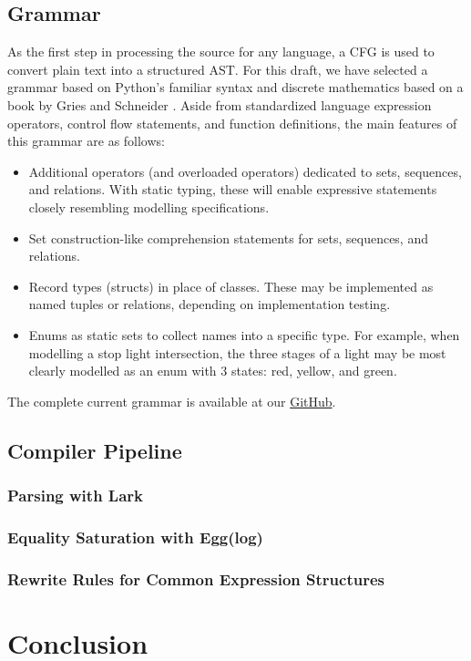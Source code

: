 \documentclass{article}
\begin{document}
\subsection{Grammar}

As the first step in processing the source for any language, a CFG is used to convert plain text into a structured AST. For this draft, we have selected a grammar based on Python's familiar syntax \cite{pythonGrammar} and discrete mathematics based on a book by Gries and Schneider \cite{griesAndSchneider}. Aside from standardized language expression operators, control flow statements, and function definitions, the main features of this grammar are as follows:
\begin{itemize}
  \item Additional operators (and overloaded operators) dedicated to sets, sequences, and relations. With static typing, these will enable expressive statements closely resembling modelling specifications.
  \item Set construction-like comprehension statements for sets, sequences, and relations.
  \item Record types (structs) in place of classes. These may be implemented as named tuples or relations, depending on implementation testing.
  \item Enums as static sets to collect names into a specific type. For example, when modelling a stop light intersection, the three stages of a light may be most clearly modelled as an enum with 3 states: red, yellow, and green.
\end{itemize}

The complete current grammar is available at our \href{https://github.com/Ant13731/compilers/blob/main/implementation/grammar.lark}{GitHub}.

\subsection{Compiler Pipeline}
\subsubsection{Parsing with Lark}
\subsubsection{Equality Saturation with Egg(log)}
\subsubsection{Rewrite Rules for Common Expression Structures}
\section{Conclusion}


\pagebreak
\nocite{*} %
\printbibliography %
\end{document}
